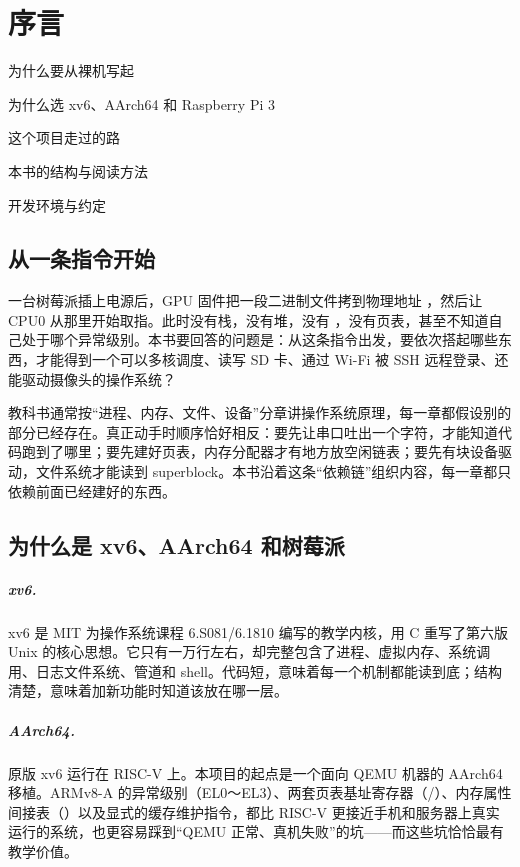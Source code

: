 \chapter{序言}

\begin{introduction}[本章内容]
  \item 为什么要从裸机写起
  \item 为什么选 xv6、AArch64 和 Raspberry Pi 3
  \item 这个项目走过的路
  \item 本书的结构与阅读方法
  \item 开发环境与约定
\end{introduction}

\section{从一条指令开始}

一台树莓派插上电源后，GPU 固件把一段二进制文件拷到物理地址 ，然后让 CPU0 从那里开始取指。此时没有栈，没有堆，没有 ，没有页表，甚至不知道自己处于哪个异常级别。本书要回答的问题是：从这条指令出发，要依次搭起哪些东西，才能得到一个可以多核调度、读写 SD 卡、通过 Wi-Fi 被 SSH 远程登录、还能驱动摄像头的操作系统？

教科书通常按“进程、内存、文件、设备”分章讲操作系统原理，每一章都假设别的部分已经存在。真正动手时顺序恰好相反：要先让串口吐出一个字符，才能知道代码跑到了哪里；要先建好页表，内存分配器才有地方放空闲链表；要先有块设备驱动，文件系统才能读到 superblock。本书沿着这条“依赖链”组织内容，每一章都只依赖前面已经建好的东西。

\section{为什么是 xv6、AArch64 和树莓派}

\paragraph{xv6.} xv6 是 MIT 为操作系统课程 6.S081/6.1810 编写的教学内核\cite{xv6book}，用 C 重写了第六版 Unix 的核心思想。它只有一万行左右，却完整包含了进程、虚拟内存、系统调用、日志文件系统、管道和 shell。代码短，意味着每一个机制都能读到底；结构清楚，意味着加新功能时知道该放在哪一层。

\paragraph{AArch64.} 原版 xv6 运行在 RISC-V 上。本项目的起点是一个面向 QEMU  机器的 AArch64 移植。ARMv8-A 的异常级别（EL0～EL3）、两套页表基址寄存器（/）、内存属性间接表（）以及显式的缓存维护指令，都比 RISC-V 更接近手机和服务器上真实运行的系统，也更容易踩到“QEMU 正常、真机失败”的坑——而这些坑恰恰最有教学价值。

